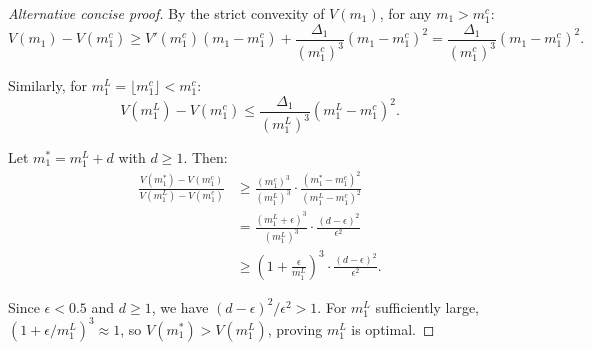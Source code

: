 \begin{proof}[Alternative concise proof]
By the strict convexity of $V(m_1)$, for any $m_1 > m_1^c$:
\[
V(m_1) - V(m_1^c) \ge V'(m_1^c)(m_1 - m_1^c) + \frac{\Delta_1}{(m_1^c)^3}(m_1 - m_1^c)^2 = \frac{\Delta_1}{(m_1^c)^3}(m_1 - m_1^c)^2.
\]

Similarly, for $m_1^L = \lfloor m_1^c \rfloor < m_1^c$:
\[
V(m_1^L) - V(m_1^c) \le \frac{\Delta_1}{(m_1^L)^3}(m_1^L - m_1^c)^2.
\]

Let $m_1^* = m_1^L + d$ with $d \ge 1$. Then:
\begin{align*}
\frac{V(m_1^*) - V(m_1^c)}{V(m_1^L) - V(m_1^c)} 
&\ge \frac{(m_1^c)^3}{(m_1^L)^3} \cdot \frac{(m_1^* - m_1^c)^2}{(m_1^L - m_1^c)^2} \\
&= \frac{(m_1^L + \epsilon)^3}{(m_1^L)^3} \cdot \frac{(d - \epsilon)^2}{\epsilon^2} \\
&\ge \left(1 + \frac{\epsilon}{m_1^L}\right)^3 \cdot \frac{(d - \epsilon)^2}{\epsilon^2}.
\end{align*}

Since $\epsilon < 0.5$ and $d \ge 1$, we have $(d - \epsilon)^2/\epsilon^2 > 1$. For $m_1^L$ sufficiently large, $(1 + \epsilon/m_1^L)^3 \approx 1$, so $V(m_1^*) > V(m_1^L)$, proving $m_1^L$ is optimal.
\end{proof}




